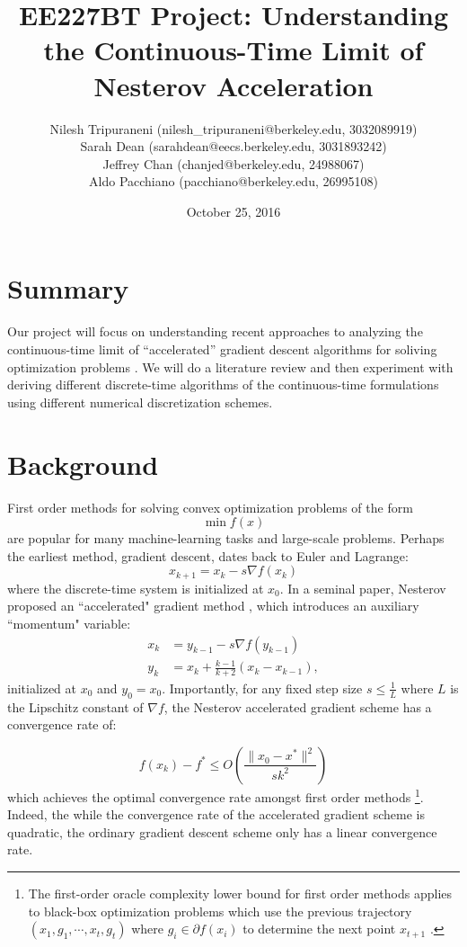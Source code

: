 \documentclass{article}
\title{EE227BT Project:
Understanding the Continuous-Time Limit of Nesterov Acceleration}
\author{Nilesh Tripuraneni (nilesh\_tripuraneni@berkeley.edu, 3032089919)\\ Sarah Dean (sarahdean@eecs.berkeley.edu, 3031893242)\\ Jeffrey Chan (chanjed@berkeley.edu, 24988067)\\ Aldo Pacchiano (pacchiano@berkeley.edu, 26995108)}
\date{October 25, 2016}
\begin{document}
\maketitle


\section{Summary}

Our project will focus on understanding recent approaches to analyzing the continuous-time limit of ``accelerated'' gradient descent algorithms for soliving optimization problems \cite{su2014differential, wibisono2016variational, krichene2015accelerated}. We will do a literature review and then experiment with deriving different discrete-time algorithms of  the continuous-time formulations using different numerical discretization schemes.

\section{Background}
First order methods for solving convex optimization problems of the form
\[\min f(x)\]
are popular for many machine-learning tasks and large-scale problems. Perhaps the earliest method, gradient descent, dates back to Euler and Lagrange:
\[x_{k+1} = x_k - s \nabla f(x_k)\]
where the discrete-time system is initialized at $x_0$. In a seminal paper, Nesterov proposed an ``accelerated" gradient method \cite{nesterov1983method}, which introduces an auxiliary ``momentum" variable:
\begin{align*}
    x_k &= y_{k-1} - s \nabla f(y_{k-1})\\
    y_k &= x_k + \frac{k-1}{k+2} (x_k - x_{k-1}),
\end{align*}
initialized at $x_0$ and $y_0 = x_0$. Importantly, 
for any fixed step size $s \leq \frac{1}{L}$ where $L$ is the Lipschitz constant of $\nabla f$, the Nesterov accelerated gradient scheme has a convergence rate of:
 
\begin{equation*}
f(x_k) - f^* \leq O \left(\frac{\|x_0 - x^*\|^2}{sk^2} \right)
\end{equation*}
which achieves the optimal convergence rate amongst first order methods \footnote{The first-order oracle complexity lower bound for first order methods applies to black-box optimization problems which use the previous trajectory $(x_1, g_1, \cdots, x_t, g_t)$ where $g_i \in \partial f(x_i)$ to determine the next point $x_{t+1}$ \cite{blair1985problem, nesterov2004introductory}.}. Indeed, the while the convergence rate of the accelerated gradient scheme is quadratic, the ordinary gradient descent scheme only has a linear convergence rate.
\end{document}
